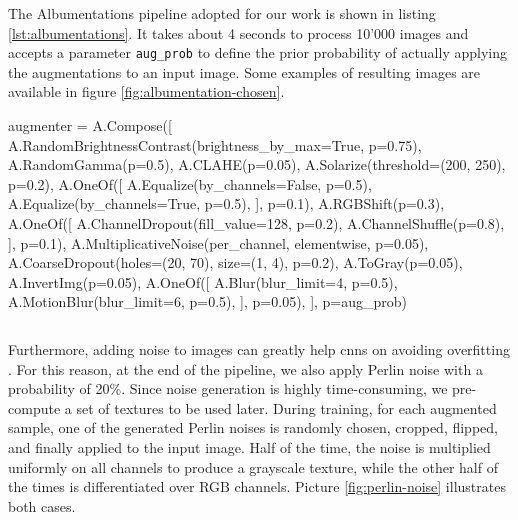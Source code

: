 \medskip

The Albumentations pipeline adopted for our work is shown in listing \ref{lst:albumentations}. It takes about 4 seconds to process 10'000 images and accepts a parameter \texttt{aug\_prob} to define the prior probability of actually applying the augmentations to an input image. Some examples of resulting images are available in figure \ref{fig:albumentation-chosen}.

\vspace{0.1cm}
\begin{python}
augmenter = A.Compose([
	A.RandomBrightnessContrast(brightness_by_max=True, p=0.75),
	A.RandomGamma(p=0.5),
	A.CLAHE(p=0.05),
	A.Solarize(threshold=(200, 250), p=0.2),
	A.OneOf([
		A.Equalize(by_channels=False, p=0.5),
		A.Equalize(by_channels=True, p=0.5),
	], p=0.1),
	A.RGBShift(p=0.3),
	A.OneOf([
		A.ChannelDropout(fill_value=128, p=0.2),
		A.ChannelShuffle(p=0.8),
	], p=0.1),
	A.MultiplicativeNoise(per_channel, elementwise, p=0.05),
	A.CoarseDropout(holes=(20, 70), size=(1, 4), p=0.2),
	A.ToGray(p=0.05),
	A.InvertImg(p=0.05),
	A.OneOf([
		A.Blur(blur_limit=4, p=0.5),
		A.MotionBlur(blur_limit=6, p=0.5),
	], p=0.05),
], p=aug_prob)
\end{python}
\vspace{-0.5cm}
\begin{lstlisting}[frame=none,caption={Chosen Albumentations pipeline}, 
label=lst:albumentations]
\end{lstlisting}

Furthermore, adding noise to images can greatly help \gls{cnn}s on avoiding overfitting \cite{shorten2019augmentationsurvey}. For this reason, at the end of the pipeline, we also apply Perlin noise \cite{perlin-noise} with a probability of 20\%. Since noise generation is highly time-consuming, we pre-compute a set of textures to be used later. During training, for each augmented sample, one of the generated Perlin noises is randomly chosen, cropped, flipped, and finally applied to the input image. Half of the time, the noise is multiplied uniformly on all channels to produce a grayscale texture, while the other half of the times is differentiated over RGB channels. Picture \ref{fig:perlin-noise} illustrates both cases.

